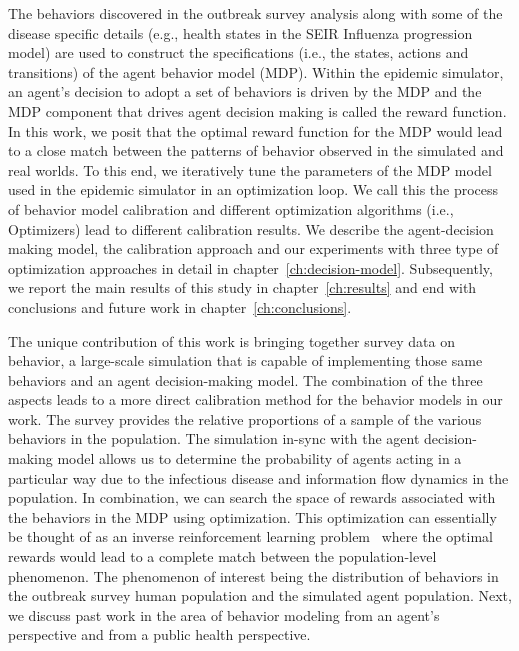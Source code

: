 \documentclass[doublespace]{VTthesis}
\begin{document}
    The behaviors discovered in the outbreak survey analysis along with some of the disease specific details (e.g., health states in the SEIR Influenza progression model) are used to construct the specifications (i.e., the states, actions and transitions) of the agent behavior model (MDP). Within the epidemic simulator, an agent's decision to adopt a set of behaviors is driven by the MDP and the MDP component that drives agent decision making is called the reward function. In this work, we posit that the optimal reward function for the MDP would lead to a close match between the patterns of behavior observed in the simulated and real worlds. To this end, we iteratively tune the parameters of the MDP model used in the epidemic simulator in an optimization loop. We call this the process of behavior model calibration and different optimization algorithms (i.e., Optimizers) lead to different calibration results. We describe the agent-decision making model, the calibration approach and our experiments with three type of optimization approaches in detail in chapter~\ref{ch:decision-model}. Subsequently, we report the main results of this study in chapter~\ref{ch:results} and end with conclusions and future work in chapter~\ref{ch:conclusions}.
    
    The unique contribution of this work is bringing together survey data on behavior, a large-scale simulation that is capable of implementing those same behaviors and an agent decision-making model. The combination of the three aspects leads to a more direct calibration method for the behavior models in our work. The survey provides the relative proportions of a sample of the various behaviors in the population. The simulation in-sync with the agent decision-making model allows us to determine the probability of agents acting in a particular way due to the infectious disease and information flow dynamics in the population. In combination, we can search the space of rewards associated with the behaviors in the MDP using optimization. This optimization can essentially be thought of as an inverse reinforcement learning problem~\cite{ng00irl} where the optimal rewards would lead to a complete match between the population-level phenomenon. The phenomenon of interest being the distribution of behaviors in the outbreak survey human population and the simulated agent population. Next, we discuss past work in the area of behavior modeling from an agent's perspective and from a public health perspective.
\end{document}
